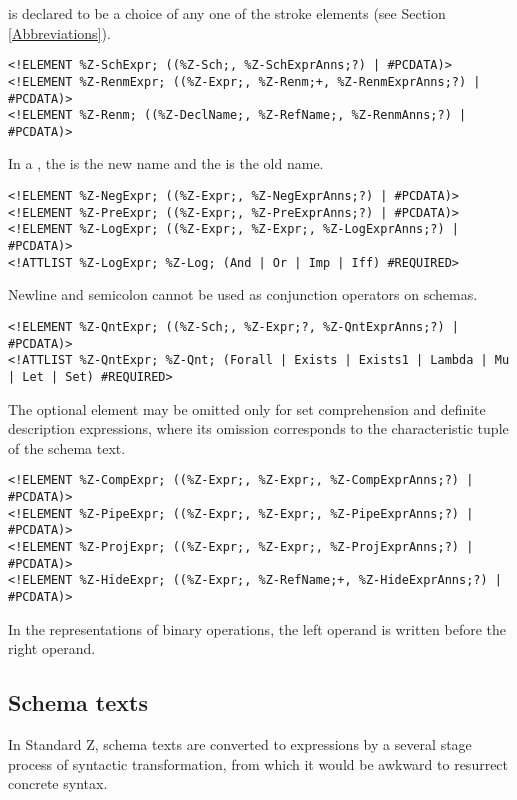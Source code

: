 \documentclass[a4paper,10pt]{article}
\begin{document}
 is declared to be a choice of any one of the stroke elements
(see Section \ref{Abbreviations}).

\begin{verbatim}
<!ELEMENT %Z-SchExpr; ((%Z-Sch;, %Z-SchExprAnns;?) | #PCDATA)>
<!ELEMENT %Z-RenmExpr; ((%Z-Expr;, %Z-Renm;+, %Z-RenmExprAnns;?) | #PCDATA)>
<!ELEMENT %Z-Renm; ((%Z-DeclName;, %Z-RefName;, %Z-RenmAnns;?) | #PCDATA)>
\end{verbatim}

In a , the  is the new name
and the  is the old name.

\begin{verbatim}
<!ELEMENT %Z-NegExpr; ((%Z-Expr;, %Z-NegExprAnns;?) | #PCDATA)>
<!ELEMENT %Z-PreExpr; ((%Z-Expr;, %Z-PreExprAnns;?) | #PCDATA)>
<!ELEMENT %Z-LogExpr; ((%Z-Expr;, %Z-Expr;, %Z-LogExprAnns;?) | #PCDATA)>
<!ATTLIST %Z-LogExpr; %Z-Log; (And | Or | Imp | Iff) #REQUIRED>
\end{verbatim}

Newline and semicolon cannot be used as conjunction operators on schemas.

\begin{verbatim}
<!ELEMENT %Z-QntExpr; ((%Z-Sch;, %Z-Expr;?, %Z-QntExprAnns;?) | #PCDATA)>
<!ATTLIST %Z-QntExpr; %Z-Qnt; (Forall | Exists | Exists1 | Lambda | Mu | Let | Set) #REQUIRED>
\end{verbatim}

The optional  element may be omitted only for
set comprehension and definite description expressions,
where its omission corresponds to the characteristic tuple of the schema text.

\begin{verbatim}
<!ELEMENT %Z-CompExpr; ((%Z-Expr;, %Z-Expr;, %Z-CompExprAnns;?) | #PCDATA)>
<!ELEMENT %Z-PipeExpr; ((%Z-Expr;, %Z-Expr;, %Z-PipeExprAnns;?) | #PCDATA)>
<!ELEMENT %Z-ProjExpr; ((%Z-Expr;, %Z-Expr;, %Z-ProjExprAnns;?) | #PCDATA)>
<!ELEMENT %Z-HideExpr; ((%Z-Expr;, %Z-RefName;+, %Z-HideExprAnns;?) | #PCDATA)>
\end{verbatim}

In the representations of binary operations,
the left operand is written before the right operand.

\subsection{Schema texts}

In Standard Z, schema texts are converted to expressions
by a several stage process of syntactic transformation,
from which it would be awkward to resurrect concrete syntax.
\end{document}
